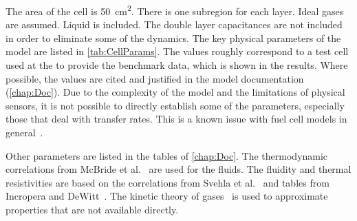 The area of the cell is \SI{50}{cm^2}.  There is one subregion for each layer.  Ideal gases are assumed.  Liquid is included.  The double layer capacitances are not included in order to eliminate some of the dynamics.  The key physical parameters of the model are listed in \autoref{tab:CellParams}.  The values roughly correspond to a test cell used at the  to provide the benchmark data, which is shown in the results.  Where possible, the values are cited and justified in the model documentation (\autoref{chap:Doc}).  Due to the complexity of the model and the limitations of physical sensors, it is not possible to directly establish some of the parameters, especially those that deal with transfer rates.  This is a known issue with fuel cell models in general~\cite{Faghri2005}.  

Other parameters are listed in the tables of \autoref{chap:Doc}.  The thermodynamic correlations from McBride et al.~\cite{McBride2002} are used for the fluids.  The fluidity and thermal resistivities are based on the correlations from Svehla et al.~\cite{Svehla1995} and tables from Incropera and DeWitt~\cite{Incropera2002}.  The kinetic theory of gases~\cite{Present1958} is used to approximate properties that are not available directly.  


